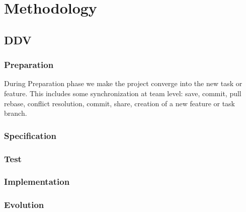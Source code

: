 
\chapter{Methodology}
\label{cha:methodology}



\section{DDV}
\label{sec:ddv}

\subsection{Preparation}
\label{sec:preparation}
During Preparation phase we make the project converge into the new
task or feature. This includes some synchronization at team level:
save, commit, pull rebase, conflict resolution, commit, share,
creation of a new feature or task branch.
%

\subsection{Specification}
\label{sec:specification}


\subsection{Test}
\label{sec:test}

\subsection{Implementation}
\label{sec:implementation}


\subsection{Evolution}
\label{sec:evolution}






